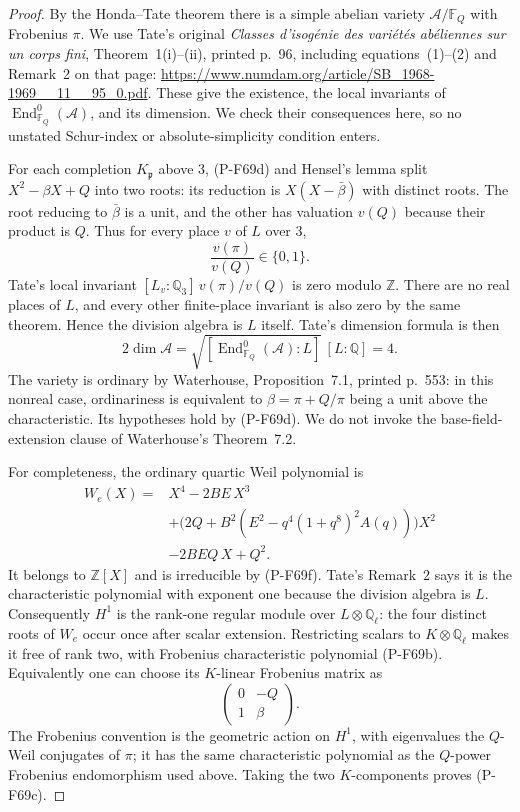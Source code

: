 \begin{proof}
By the Honda--Tate theorem there is a simple abelian variety
$\mathcal A/\mathbb F_Q$ with Frobenius $\pi$.
We use Tate's original \emph{Classes d'isog\'enie des
vari\'et\'es ab\'eliennes sur un corps fini}, Theorem~1(i)--(ii),
printed p.~96, including equations~(1)--(2) and
Remark~2 on that page:
\url{https://www.numdam.org/article/SB_1968-1969__11__95_0.pdf}.
These give the existence, the local invariants of
$\operatorname{End}^0_{\mathbb F_Q}(\mathcal A)$, and its
dimension.  We check their consequences here, so no
unstated Schur-index or absolute-simplicity condition enters.

For each completion $K_{\mathfrak p}$ above $3$, (P-F69d)
and Hensel's lemma split $X^2-\beta X+Q$ into two roots:
its reduction is $X(X-\bar\beta)$ with distinct roots.
The root reducing to $\bar\beta$ is a unit, and the other
has valuation $v(Q)$ because their product is $Q$.
Thus for every place $v$ of $L$ over $3$,
\[
                         \frac{v(\pi)}{v(Q)}\in\{0,1\}.
\]
Tate's local invariant
$[L_v:\mathbb Q_3]\,v(\pi)/v(Q)$ is zero modulo $\mathbb Z$.
There are no real places of $L$, and every other finite-place
invariant is also zero by the same theorem.  Hence the
division algebra is $L$ itself.  Tate's dimension formula is
then
\[
 2\dim\mathcal A=
 \sqrt{[\operatorname{End}^0_{\mathbb F_Q}(\mathcal A):L]}\,
 [L:\mathbb Q]=4.
\]
The variety is ordinary by Waterhouse, Proposition~7.1,
printed p.~553: in this nonreal case, ordinariness is
equivalent to $\beta=\pi+Q/\pi$ being a unit above the
characteristic.  Its hypotheses hold by (P-F69d).
We do not invoke the base-field-extension clause of
Waterhouse's Theorem~7.2.

For completeness, the ordinary quartic Weil polynomial is
\[
\begin{split}
 W_e(X)={}&X^4-2BE\,X^3\\
 &+\bigl(2Q+B^2(E^2-q^4(1+q^8)^2A(q))\bigr)X^2\\
 &-2BEQ\,X+Q^2.
\end{split}                                                   \tag{P-F69g}
\]
It belongs to $\mathbb Z[X]$ and is irreducible by (P-F69f).
Tate's Remark~2 says it is the characteristic polynomial
with exponent one because the division algebra is $L$.
Consequently $H^1$ is the rank-one regular module over
$L\otimes\mathbb Q_\ell$: the four distinct roots of $W_e$
occur once after scalar extension.  Restricting scalars
to $K\otimes\mathbb Q_\ell$ makes it free of rank two,
with Frobenius characteristic polynomial (P-F69b).
Equivalently one can choose its $K$-linear Frobenius matrix as
\[
                         \begin{pmatrix}0&-Q\\1&\beta\end{pmatrix}.
\]
The Frobenius convention is the geometric action on
$H^1$, with eigenvalues the $Q$-Weil conjugates of $\pi$;
it has the same characteristic polynomial as the
$Q$-power Frobenius endomorphism used above.
Taking the two $K$-components proves (P-F69c).
\end{proof}

